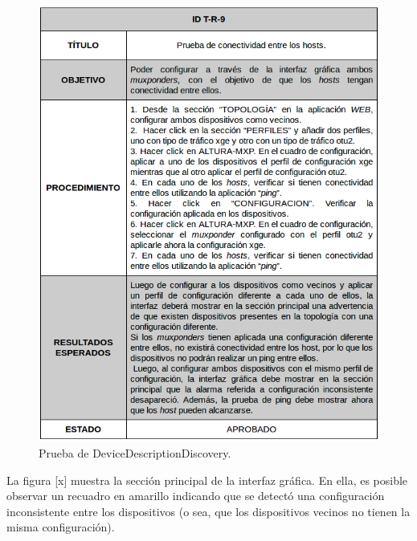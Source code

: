       \begin{figure}[H]
        \centering
        \includegraphics[scale=0.5]{Figures/test9.png}
        \caption{Prueba de DeviceDescriptionDiscovery.}
        \label{fig:test2}
      \end{figure}

      La figura [x] muestra la sección principal de la interfaz gráfica. En ella, es posible observar un recuadro en amarillo indicando que se detectó una configuración inconsistente entre los dispositivos (o sea, que los dispositivos vecinos no tienen la misma configuración). 

